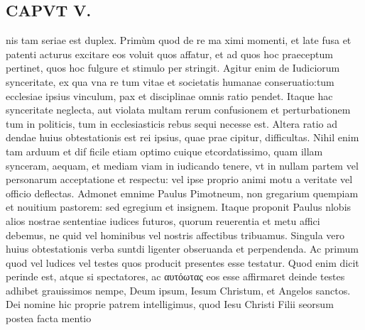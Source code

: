 \documentclass{article}
\begin{document}
\begin{pages}
\section*{CAPVT  V. }
\marginpar{[ p.329 ]}\pstart nis tam seriae est duplex. Primùm quod de re ma ximi momenti, et late fusa et patenti acturus excitare eos voluit quos affatur, et ad quos hoc praeceptum pertinet, quos hoc fulgure et stimulo per stringit. Agitur enim de Iudiciorum synceritate, ex qua vna re tum vitae et societatis humanae conseruatio:tum ecclesiae ipsius vinculum, pax et disciplinae omnis ratio pendet. Itaque hac synceritate neglecta, aut violata multam rerum confusionem et perturbationem tum in politicis, tum in ecclesiasticis rebus sequi necesse est. Altera ratio ad dendae huius obtestationis est rei ipsius, quae prae cipitur, difficultas. Nihil enim tam arduum et dif ficile etiam optimo cuique etcordatissimo, quam illam synceram, aequam, et mediam viam in iudicando tenere, vt in nullam partem vel personarum acceptatione et respectu: vel ipse proprio animi motu a veritate vel officio deflectas. Admonet emnime Paulus Pimotneum, non gregarium quempiam et nouitium pastorem: sed egregium et insignem. Itaque proponit Paulus nlobis alios nostrae sententiae iudices futuros, quorum reuerentia et metu affici debemus, ne quid vel hominibus vel nostris affectibus tribuamus.  \pend\pstart Singula vero huius obtestationis verba suntdi ligenter obseruanda et perpendenda. Ac primum quod vel ludices vel testes quos producit presentes esse testatur. Quod enim dicit perinde est, atque  si spectatores, ac αυτόωτας eos esse affirmaret deinde testes adhibet grauissimos nempe, Deum ipsum, Iesum Christum, et Angelos sanctos. Dei nomine hic proprie patrem intelligimus, quod Iesu Christi Filii seorsum postea facta mentio  \pend

\end{pages}
\end{document}
